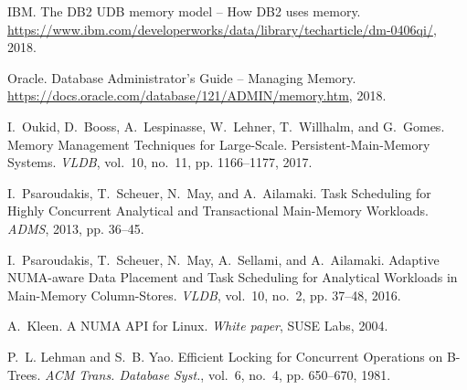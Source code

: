 \documentclass[11pt,dvipdfm]{article}
\begin{document}
\begin{thebibliography}{10}
\begin{small}
IBM. \newblock The DB2 UDB memory model -- How DB2 uses memory. \newblock \url{https://www.ibm.com/developerworks/data/library/techarticle/dm-0406qi/}, 2018.

Oracle. \newblock Database Administrator’s Guide -- Managing Memory. \newblock \url{https://docs.oracle.com/database/121/ADMIN/memory.htm}, 2018.

I.~Oukid, D.~Booss, A.~Lespinasse, W.~Lehner, T.~Willhalm, and G.~Gomes. \newblock Memory Management Techniques for Large-Scale. Persistent-Main-Memory Systems. \newblock \emph{VLDB}, vol.~10, no.~11, pp. 1166--1177, 2017.

I.~Psaroudakis, T.~Scheuer, N.~May, and A.~Ailamaki. \newblock Task Scheduling for Highly Concurrent Analytical and Transactional Main-Memory Workloads. \newblock \emph{ADMS}, 2013, pp. 36--45.

I.~Psaroudakis, T.~Scheuer, N.~May, A.~Sellami, and A.~Ailamaki. \newblock Adaptive NUMA-aware Data Placement and Task Scheduling for Analytical Workloads in Main-Memory Column-Stores. \newblock \emph{VLDB}, vol.~10, no.~2, pp. 37--48, 2016.

A.~Kleen. \newblock A NUMA API for Linux. \newblock \emph{White paper}, SUSE Labs, 2004.

P.~L. Lehman and S.~B. Yao. \newblock Efficient Locking for Concurrent Operations on B-Trees. \newblock \emph{ACM Trans. Database Syst.}, vol.~6, no.~4, pp. 650--670, 1981.
\end{small}
\end{thebibliography}
\end{document}
